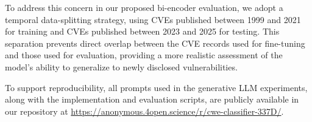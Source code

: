 \documentclass[conference,compsoc]{IEEEtran}
\begin{document}
To address this concern in our proposed bi-encoder
evaluation, we adopt a temporal data-splitting
strategy, using CVEs published between 1999 and
2021 for training and CVEs published between 2023
and 2025 for testing. This separation prevents
direct overlap between the CVE records used for
fine-tuning and those used for evaluation, providing
a more realistic assessment of the model's ability
to generalize to newly disclosed vulnerabilities.

To support reproducibility, all prompts used in the
generative LLM experiments, along with the implementation
and evaluation scripts, are publicly available in our
repository at
\url{https://anonymous.4open.science/r/cwe-classifier-337D/}.





\end{document}
